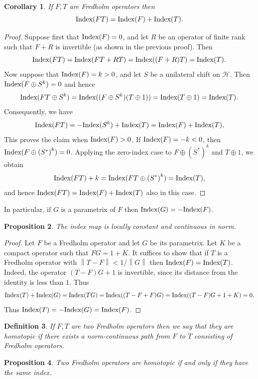 \documentclass{book}
\newtheorem{definition}{Definition}[section]
\newtheorem{proposition}[definition]{Proposition}
\newtheorem{corollary}[definition]{Corollary}
\def\Index{\textnormal{Index}}
\begin{document}
\begin{corollary}
  If \(F,T\) are Fredholm operators then
  \[
    \Index(FT)=\Index(F)+\Index(T).
  \]
\end{corollary}
\begin{proof}
  Suppose first that \(\Index(F)=0\), and let \(R\) be an operator of finite rank such that
  \(F+R\) is invertible (as shown in the previous proof). Then
  \[
    \Index(FT)=\Index(FT+RT)=\Index((F+R)T)=\Index(T).
  \]
  Now suppose that \(\Index(F)=k>0\), and let \(S\) be a unilateral shift on \(\mathcal{H}\).
  Then \(\Index(F\oplus S^k)=0\) and hence
  \[
    \Index(FT\oplus S^k)=\Index((F\oplus S^k)(T\oplus 1))=\Index(T\oplus 1)=\Index(T).
  \]
  Consequently, we have
  \[
    \Index(FT)=-\Index(S^k)+\Index(T)=\Index(F)+\Index(T),
  \]
  This proves the claim when \(\Index(F)>0\). If \(\Index(F)=-k<0\), then
  \(\Index(F\oplus {(S^*)}^k)=0\). Applying the zero-index case to
  \(F\oplus {(S^*)}^k\) and \(T\oplus 1\), we obtain
  \[
    \Index(FT)+k=\Index(FT\oplus {(S^*)}^k)=\Index(T),
  \]
  and hence \(\Index(FT)=\Index(F)+\Index(T)\) also in this case.
\end{proof}
In particular, if \(G\) is a parametrix of \(F\) then \(\Index(G)=-\Index(F)\).
\begin{proposition}
  The index map is locally constant and continuous in norm.
\end{proposition}
\begin{proof}
  Let \(F\) be a Fredholm operator and let \(G\) be its parametrix. Let \(K\) be a compact operator
  such that \(FG=1+K\). It suffices to show that if \(T\) is a Fredholm operator with 
  \(\left\|T-F\right\|<1/\left\|G\right\|\) then \(\Index(F)=\Index(T)\). Indeed, the operator \((T-F)G+1\)
  is invertible, since its distance from the identity is less than \(1\). Thus
  \[
    \Index(T)+\Index(G) = \Index(TG) = \Index((T-F+F)G) = \Index((T-F)G+1+K) = 0.  
  \]
  Thus \(\Index(T)=-\Index(G)=\Index(F)\).
\end{proof}
\begin{definition}
  If \(F,T\) are two Fredholm operators then we say that they are \textnormal{homotopic} if there exists
  a norm-continuous path from \(F\) to \(T\) consisting of Fredholm operators.
\end{definition}
\begin{proposition}
  Two Fredholm operators are homotopic if and only if they have the same index.
\end{proposition}
\end{document}
